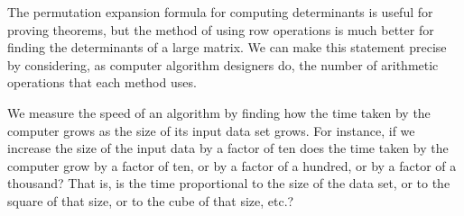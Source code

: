 The permutation expansion formula for computing determinants is useful 
for proving theorems, but the method of using row operations
is much better for finding the determinants of a large matrix.
We can make this statement 
precise by considering, as computer algorithm designers do,
the number of arithmetic operations that each method uses.

We measure the speed of an algorithm by finding
how the time taken by the computer grows as the size of
its input data set grows. 
For instance, if
we increase the size of the input data by a
factor of ten
does the time taken by the computer grow by a factor of ten,
or by a factor of a hundred, or by a factor of a thousand?
That is, 
is the time proportional to the size of the data set, 
or to the square of that size, or to the cube of that size, etc.? 


